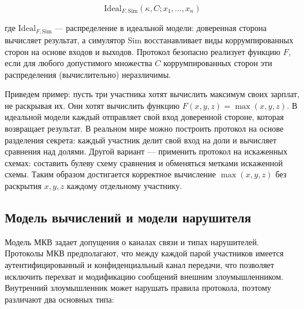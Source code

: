 \begin{equation}
\mathrm{Ideal}_{F,\mathrm{Sim}}(\kappa, C; x_{1},\ldots,x_{n})
\end{equation}

где \(\mathrm{Ideal}_{F,\mathrm{Sim}}\) --- распределение в идеальной модели: доверенная сторона вычисляет результат, а симулятор \(\mathrm{Sim}\) восстанавливает виды коррумпированных сторон на основе входов и выходов. Протокол безопасно реализует функцию \(F\), если для любого допустимого множества \(C\) коррумпированных сторон эти распределения (вычислительно) неразличимы.

Приведем пример: пусть три участника хотят вычислить максимум своих зарплат, не раскрывая их. Они хотят вычислить функцию \(F(x,y,z)=\max(x,y,z)\). В идеальной модели каждый отправляет свой вход доверенной стороне, которая возвращает результат. В реальном мире можно построить протокол на основе разделения секрета: каждый участник делит свой вход на доли и вычисляет сравнения над долями. Другой вариант --- применить протокол на искаженных схемах: составить булеву схему сравнения и обменяться метками искаженной схемы. Таким образом достигается корректное вычисление \(\max(x,y,z)\) без раскрытия \(x,y,z\) каждому отдельному участнику.

\subsection{Модель вычислений и модели нарушителя}
\label{subsec:adversary-models}

Модель МКВ задает допущения о каналах связи и типах нарушителей. Протоколы МКВ предполагают, что между каждой парой участников имеется аутентифицированный и конфиденциальный канал передачи, что позволяет исключить перехват и модификацию сообщений внешним злоумышленником. Внутренний злоумышленник может нарушать правила протокола, поэтому различают два основных типа:

